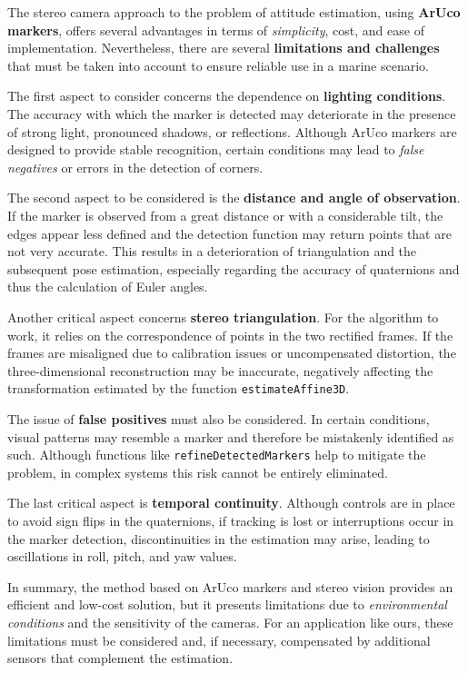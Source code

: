 The stereo camera approach to the problem of attitude estimation, using \textbf{ArUco markers}, offers several advantages in terms of \textit{simplicity}, cost, and ease of implementation. Nevertheless, there are several \textbf{limitations and challenges} that must be taken into account to ensure reliable use in a marine scenario.

The first aspect to consider concerns the dependence on \textbf{lighting conditions}. The accuracy with which the marker is detected may deteriorate in the presence of strong light, pronounced shadows, or reflections. Although ArUco markers are designed to provide stable recognition, certain conditions may lead to \textit{false negatives} or errors in the detection of corners.

The second aspect to be considered is the \textbf{distance and angle of observation}. If the marker is observed from a great distance or with a considerable tilt, the edges appear less defined and the detection function may return points that are not very accurate. This results in a deterioration of triangulation and the subsequent pose estimation, especially regarding the accuracy of quaternions and thus the calculation of Euler angles.

Another critical aspect concerns \textbf{stereo triangulation}. For the algorithm to work, it relies on the correspondence of points in the two rectified frames. If the frames are misaligned due to calibration issues or uncompensated distortion, the three-dimensional reconstruction may be inaccurate, negatively affecting the transformation estimated by the function \texttt{estimateAffine3D}.

The issue of \textbf{false positives} must also be considered. In certain conditions, visual patterns may resemble a marker and therefore be mistakenly identified as such. Although functions like \texttt{refineDetectedMarkers} help to mitigate the problem, in complex systems this risk cannot be entirely eliminated.

The last critical aspect is \textbf{temporal continuity}. Although controls are in place to avoid sign flips in the quaternions, if tracking is lost or interruptions occur in the marker detection, discontinuities in the estimation may arise, leading to oscillations in roll, pitch, and yaw values.

In summary, the method based on ArUco markers and stereo vision provides an efficient and low-cost solution, but it presents limitations due to \textit{environmental conditions} and the sensitivity of the cameras. For an application like ours, these limitations must be considered and, if necessary, compensated by additional sensors that complement the estimation.
